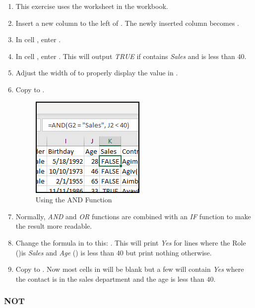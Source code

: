 \begin{enumerate}
	\item This exercise uses the  worksheet in the  workbook.
	\item Insert a new column to the left of . The newly inserted column becomes .
	\item In cell , enter .
	\item In cell , enter . This will output \textit{TRUE} if  contains \textit{Sales} and  is less than $ 40 $. 
	\item Adjust the width of  to properly display the value in .
	\item Copy  to .
	
	\begin{figure}[H]
		\centering
		\includegraphics[width=\maxwidth{.75\linewidth}]{gfx/ch09_fig47}
		\caption{Using the AND Function}
		\label{09:fig47}
	\end{figure}

	\item Normally, \textit{AND} and \textit{OR} functions are combined with an \textit{IF} function to make the result more readable.
	\item Change the formula in  to this: . This will print \textit{Yes} for lines where the Role ()is \textit{Sales} and \textit{Age} () is less than $ 40 $ but print nothing otherwise. 
	\item Copy  to . Now most cells in  will be blank but a few will contain \textit{Yes} where the contact is in the sales department and the age is less than $ 40 $.
\end{enumerate}

\subsubsection{NOT}

